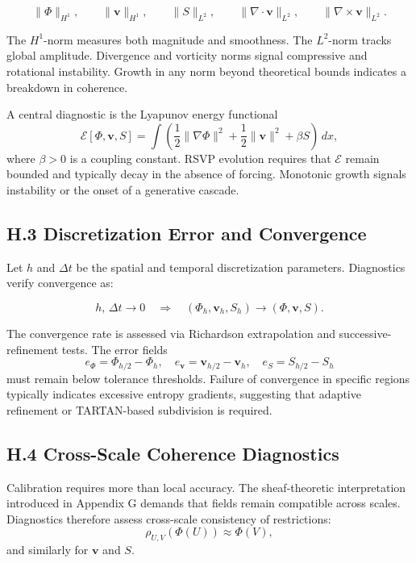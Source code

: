 \documentclass[12pt]{article}
\begin{document}
\[
\|\Phi\|_{H^1}, \qquad \|\mathbf{v}\|_{H^1}, \qquad \|S\|_{L^2}, 
\qquad \|\nabla \cdot \mathbf{v}\|_{L^2}, 
\qquad \|\nabla \times \mathbf{v}\|_{L^2}.
\]

The $H^1$-norm measures both magnitude and smoothness.  
The $L^2$-norm tracks global amplitude.  
Divergence and vorticity norms signal compressive and rotational instability.  
Growth in any norm beyond theoretical bounds indicates a breakdown in 
coherence.

A central diagnostic is the Lyapunov energy functional  
\[
\mathcal{E}[\Phi, \mathbf{v}, S]
= \int \left( 
\frac{1}{2}\|\nabla \Phi\|^2 
+ \frac{1}{2}\|\mathbf{v}\|^2 
+ \beta S \right) \, dx,
\]
where $\beta > 0$ is a coupling constant.  
RSVP evolution requires that $\mathcal{E}$ remain bounded and typically decay 
in the absence of forcing.  
Monotonic growth signals instability or the onset of a generative cascade.

\subsection*{H.3 Discretization Error and Convergence}

Let $h$ and $\Delta t$ be the spatial and temporal discretization parameters.  
Diagnostics verify convergence as:

\[
h,\, \Delta t \rightarrow 0 
\quad \Longrightarrow \quad
(\Phi_h, \mathbf{v}_h, S_h) \rightarrow (\Phi, \mathbf{v}, S).
\]

The convergence rate is assessed via Richardson extrapolation and 
successive-refinement tests.  
The error fields  
\[
e_\Phi = \Phi_{h/2} - \Phi_{h}, \quad
e_{\mathbf{v}} = \mathbf{v}_{h/2} - \mathbf{v}_{h}, \quad
e_S = S_{h/2} - S_{h}
\]
must remain below tolerance thresholds.  
Failure of convergence in specific regions typically indicates excessive 
entropy gradients, suggesting that adaptive refinement or TARTAN-based 
subdivision is required.

\subsection*{H.4 Cross-Scale Coherence Diagnostics}

Calibration requires more than local accuracy.  
The sheaf-theoretic interpretation introduced in Appendix G demands that 
fields remain compatible across scales.  
Diagnostics therefore assess cross-scale consistency of restrictions:
\[
\rho_{U,V}(\Phi(U)) \approx \Phi(V),
\]
and similarly for $\mathbf{v}$ and $S$.
\end{document}
